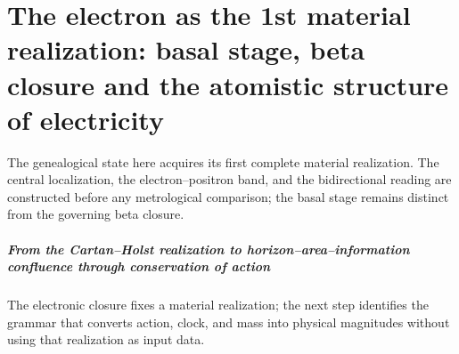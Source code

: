 \chapter{The electron as the 1st material realization: basal stage, beta closure and the atomistic structure of electricity}
\label{chap:parte-iv-48}

The genealogical state here acquires its first complete material realization. The central localization, the electron--positron band, and the bidirectional reading are constructed before any metrological comparison; the basal stage remains distinct from the governing beta closure.





\paragraph{From the Cartan–Holst realization to horizon–area–information confluence through conservation of action} The electronic closure fixes a material realization; the next step identifies the grammar that converts action, clock, and mass into physical magnitudes without using that realization as input data.
